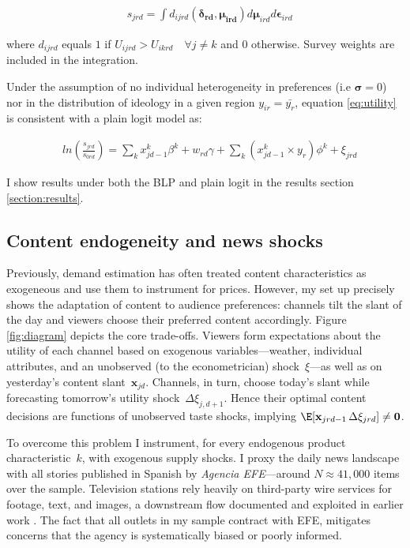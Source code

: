 \documentclass[12pt]{article}
\begin{document}
	
	\begin{equation}\label{eq:shares}
	\begin{aligned}
		& s_{jrd} = \int d_{ijrd}(\bm{\delta_{rd}},\bm{\mu_{ird}})d\bm{\mu}_{ird}d\bm{\epsilon}_{ird}
	\end{aligned} 
\end{equation} 
	
	where $d_{ijrd}$ equals $1$ if $U_{ijrd}>U_{ikrd} \quad \forall j\neq k$ and $0$ otherwise. Survey weights are included in the integration. 

Under the assumption of no individual heterogeneity in preferences  (i.e $\bm{\sigma}=0$) nor in  the distribution of ideology in a given region $y_{ir}= \bar{y_r}$,  equation \ref{eq:utility} is consistent with a plain logit model as:


\begin{equation}\label{eq:logit}
	\begin{aligned}
		& ln \left(\frac{s_{jrd}}{s_{0rd}}\right)= \sum_k x_{jd-1}^k\beta^k+w_{rd}   \gamma  +\sum_k \left(x_{jd-1}^k\times y_r \right) \phi^k +  \xi_{jrd}
	\end{aligned} 
\end{equation} 


I show results under both the BLP and plain logit in the results section \ref{section:results}. 
	
	\subsection{Content endogeneity and news shocks} \label{section:endogeneity}
	
	
Previously, demand estimation has often treated content characteristics as exogeneous and use them to instrument for prices. However, my set up precisely shows the adaptation of content to audience preferences: channels tilt the slant of the day and viewers choose their preferred content accordingly. 
	Figure \ref{fig:diagram} depicts the core trade-offs. Viewers form expectations about the utility of each channel based on exogenous variables—weather, individual attributes, and an unobserved (to the econometrician) shock~$\xi$—as well as on yesterday’s content slant~$\bm{x}_{jd}$.  
	Channels, in turn, choose today’s slant while forecasting tomorrow’s utility shock~$\Delta\xi_{j,d+1}$.  
	Hence their optimal content decisions are functions of unobserved taste shocks, implying $\E[\mathbf{x}_{jrd-1}\,\Delta\xi_{jrd}] \neq \mathbf{0}$.
	
	To overcome this problem I instrument, for every endogenous product characteristic~$k$, with exogenous supply shocks.  
	I proxy the daily news landscape with all stories published in Spanish by \emph{Agencia EFE}—around $N\!\approx\!41{,}000$ items over the sample.  
	Television stations rely heavily on third-party wire services for footage, text, and images, a downstream flow documented and exploited in earlier work \citep{milena}.  The fact that all outlets in my sample contract with EFE, mitigates concerns that the agency is systematically biased or poorly informed.
	
\end{document}
